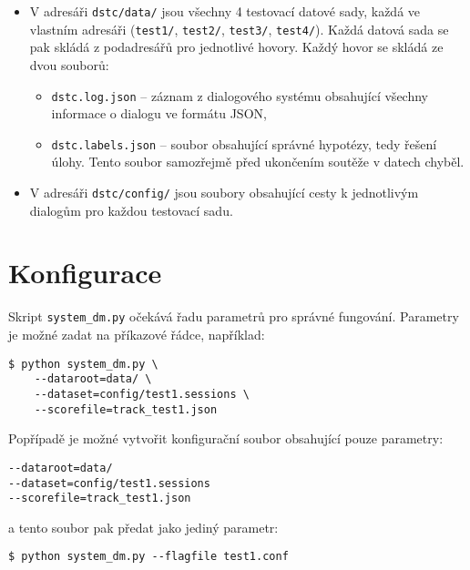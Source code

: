 \begin{itemize}
\item V adresáři \texttt{dstc/data/} jsou všechny 4 testovací datové sady, každá ve vlastním adresáři (\texttt{test1/}, \texttt{test2/}, \texttt{test3/}, \texttt{test4/}).
Každá datová sada se pak skládá z podadresářů pro jednotlivé hovory.
Každý hovor se skládá ze dvou souborů:
	\begin{itemize}
	\item \texttt{dstc.log.json} -- záznam z dialogového systému obsahující všechny informace o dialogu ve formátu JSON,
	\item \texttt{dstc.labels.json} -- soubor obsahující správné hypotézy, tedy řešení úlohy. Tento soubor samozřejmě před ukončením soutěže v datech  chyběl.
	\end{itemize}

\item V adresáři \texttt{dstc/config/} jsou soubory obsahující cesty k jednotlivým dialogům pro každou testovací sadu.
\end{itemize}

\section{Konfigurace}

Skript \texttt{system\_dm.py} očekává řadu parametrů pro správné fungování.
Parametry je možné zadat na příkazové řádce, například:
\begin{verbatim}
$ python system_dm.py \
    --dataroot=data/ \
    --dataset=config/test1.sessions \
    --scorefile=track_test1.json
\end{verbatim}

Popřípadě je možné vytvořit konfigurační soubor obsahující pouze parametry:
\begin{verbatim}
--dataroot=data/
--dataset=config/test1.sessions
--scorefile=track_test1.json
\end{verbatim}
a tento soubor pak předat jako jediný parametr:
\begin{verbatim}
$ python system_dm.py --flagfile test1.conf
\end{verbatim}

